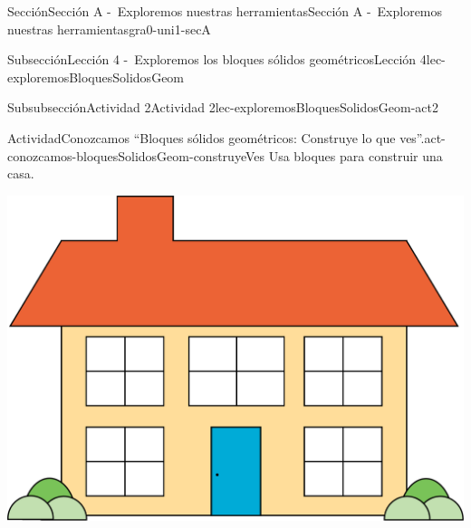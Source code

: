 \begin{sectionptx}{Sección}{Sección A -~Exploremos nuestras herramientas}{}{Sección A -~Exploremos nuestras herramientas}{}{}{gra0-uni1-secA}
\begin{subsectionptx}{Subsección}{Lección 4 -~Exploremos los bloques sólidos geométricos}{}{Lección 4}{}{}{lec-exploremosBloquesSolidosGeom}
\begin{subsubsectionptx}{Subsubsección}{Actividad 2}{}{Actividad 2}{}{}{lec-exploremosBloquesSolidosGeom-act2}
\begin{activity}{Actividad}{Conozcamos “Bloques sólidos geométricos: Construye lo que ves”.}{act-conozcamos-bloquesSolidosGeom-construyeVes}%
Usa bloques para construir una casa.%
\begin{image}{0}{1}{0}{}%
\includegraphics[max width=\linewidth, center]{external/png-source/house.png}
\end{image}%
\begin{cutoutpage}


\end{cutoutpage}
\end{activity}
\end{subsubsectionptx}
\end{subsectionptx}
\end{sectionptx}
